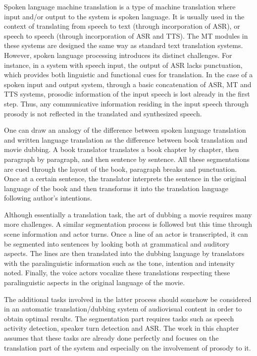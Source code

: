 Spoken language machine translation is a type of machine translation where input and/or output to the system is spoken language. It is usually used in the context of translating from speech to text (through incorporation of ASR), or speech to speech (through incorporation of ASR and TTS). The MT modules in these systems are designed the same way as standard text translation systems. However, spoken language processing introduces its distinct challenges. For instance, in a system with speech input, the output of ASR lacks punctuation, which provides both linguistic and functional cues for translation. In the case of a spoken input and output system, through a basic concatenation of ASR, MT and TTS systems, prosodic information of the input speech is lost already in the first step. Thus, any communicative information residing in the input speech through prosody is not reflected in the translated and synthesized speech. 

One can draw an analogy of the difference between spoken language translation and written language translation as the difference between book translation and movie dubbing. A book translator translates a book chapter by chapter, then paragraph by paragraph, and then sentence by sentence. All these segmentations are cued through the layout of the book, paragraph breaks and punctuation. Once at a certain sentence, the translator interprets the sentence in the original language of the book and then transforms it into the translation language following author's intentions. 

Although essentially a translation task, the art of dubbing a movie requires many more challenges. A similar segmentation process is followed but this time through scene information and actor turns. Once a line of an actor is transcripted, it can be segmented into sentences by looking both at grammatical and auditory aspects. The lines are then translated into the dubbing language by translators with the paralinguistic information such as the tone, intention and intensity noted. Finally, the voice actors vocalize these translations respecting these paralinguistic aspects in the original language of the movie. 

The additional tasks involved in the latter process should somehow be considered in an automatic translation/dubbing system of audiovisual content in order to obtain optimal results. The segmentation part requires tasks such as speech activity detection, speaker turn detection and ASR. The work in this chapter assumes that these tasks are already done perfectly and focuses on the translation part of the system and especially on the involvement of prosody to it. 


